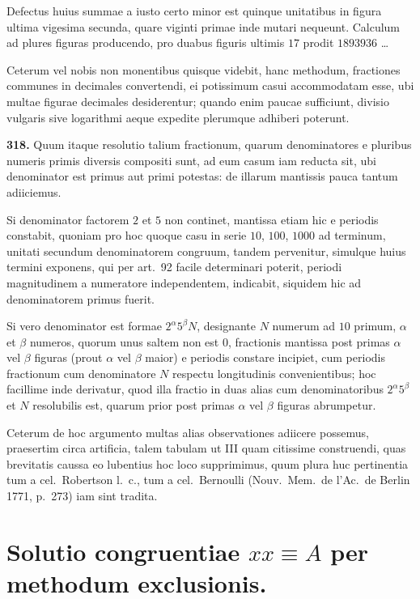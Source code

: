 \documentclass[12pt,a4paper]{article}
\theoremstyle{plain}
\theoremstyle{definition}
\theoremstyle{remark}
\begin{document}
Defectus huius summae a iusto certo minor est quinque unitatibus in figura ultima vigesima secunda, quare viginti primae inde mutari nequeunt. Calculum ad plures figuras producendo, pro duabus figuris ultimis $17$ prodit $1893936$ \ldots

Ceterum vel nobis non monentibus quisque videbit, hanc methodum, fractiones communes in decimales convertendi, ei potissimum casui accommodatam esse, ubi multae figurae decimales desiderentur; quando enim paucae sufficiunt, divisio vulgaris sive logarithmi aeque expedite plerumque adhiberi poterunt.

\textbf{318.} Quum itaque resolutio talium fractionum, quarum denominatores e pluribus numeris primis diversis compositi sunt, ad eum casum iam reducta sit, ubi denominator est primus aut primi potestas: de illarum mantissis pauca tantum adiiciemus.

Si denominator factorem $2$ et $5$ non continet, mantissa etiam hic e periodis constabit, quoniam pro hoc quoque casu in serie $10$, $100$, $1000$ ad terminum, unitati secundum denominatorem congruum, tandem pervenitur, simulque huius termini exponens, qui per art.~92 facile determinari poterit, periodi magnitudinem a numeratore independentem, indicabit, siquidem hic ad denominatorem primus fuerit.

Si vero denominator est formae $2^\alpha 5^\beta N$, designante $N$ numerum ad $10$ primum, $\alpha$ et $\beta$ numeros, quorum unus saltem non est $0$, fractionis mantissa post primas $\alpha$ vel $\beta$ figuras (prout $\alpha$ vel $\beta$ maior) e periodis constare incipiet, cum periodis fractionum cum denominatore $N$ respectu longitudinis convenientibus; hoc facillime inde derivatur, quod illa fractio in duas alias cum denominatoribus $2^\alpha 5^\beta$ et $N$ resolubilis est, quarum prior post primas $\alpha$ vel $\beta$ figuras abrumpetur.

Ceterum de hoc argumento multas alias observationes adiicere possemus, praesertim circa artificia, talem tabulam ut III quam citissime construendi, quas brevitatis caussa eo lubentius hoc loco supprimimus, quum plura huc pertinentia tum a cel.~Robertson l.~c., tum a cel.~Bernoulli (Nouv.~Mem.~de l'Ac.~de Berlin 1771, p.~273) iam sint tradita.

\section*{Solutio congruentiae $xx \equiv A$ per methodum exclusionis.}
\end{document}
